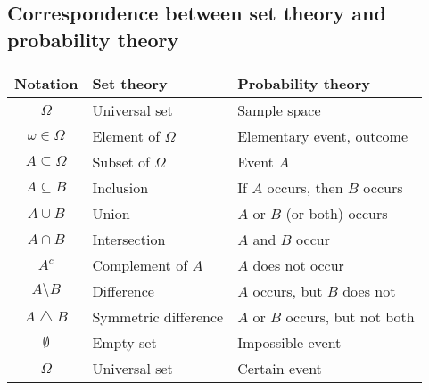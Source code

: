 \documentclass[lecture]{csm}
\begin{document}
\subsection*{Correspondence between set theory and probability theory}
\vspace*{3ex}
\begin{center}
\begin{tabular}{|c|l|l|} \hline
Notation 			& Set theory				& Probability theory \\ \hline
$\Omega$				& Universal set			& Sample space \\ 
$\omega\in\Omega$	& Element of $\Omega$	& Elementary event, outcome \\
$A\subseteq\Omega$	& Subset of $\Omega$		& Event $A$ \\
$A\subseteq B$		& Inclusion				& If $A$ occurs, then $B$ occurs \\
$A\cup B$			& Union					& $A$ or $B$ (or both) occurs \\ 
$A\cap B$			& Intersection			& $A$ and $B$ occur\\ 
$A^c$				& Complement of $A$		& $A$ does not occur \\
$A\setminus B$		& Difference				& $A$ occurs, but $B$ does not \\
$A\bigtriangleup B$	& Symmetric difference	& $A$ or $B$ occurs, but not both \\
$\emptyset$			& Empty set 				& Impossible event \\
$\Omega$				& Universal set			& Certain event \\ \hline
\end{tabular}
\end{center}

\end{document}
